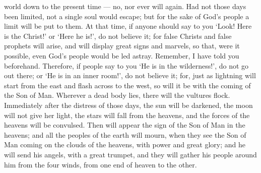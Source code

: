 world down to the present time --- no, nor ever will again.
 Had not those days been limited, not a single soul would
escape; but for the sake of God's people a limit will be put to them.
 At that time, if anyone should say to you `Look! Here is
the Christ!' or `Here he is!', do not believe it;  for
false Christs and false prophets will arise, and will display great
signs and marvels, so that, were it possible, even God's people would be
led astray.  Remember, I have told you beforehand.
 Therefore, if people say to you `He is in the
wilderness!', do not go out there; or `He is in an inner room!', do not
believe it;  for, just as lightning will start from the
east and flash across to the west, so will it be with the coming of the
Son of Man.  Wherever a dead body lies, there will the
vultures flock.  Immediately after the distress of those
days, the sun will be darkened, the moon will not give her light, the
stars will fall from the heavens, and the forces of the heavens will be
convulsed.  Then will appear the sign of the Son of Man in
the heavens; and all the peoples of the earth will mourn, when they see
the Son of Man coming on the clouds of the heavens, with power and great
glory;  and he will send his angels, with a great trumpet,
and they will gather his people around him from the four winds, from one
end of heaven to the other.

